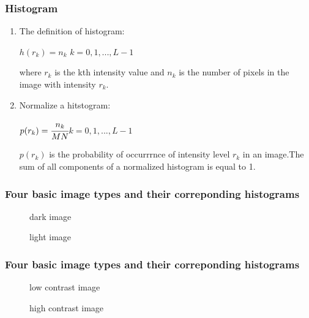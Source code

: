 \documentclass[notheorems,serif,table,compress]{beamer}  %
\begin{document}

\begin{frame}[fragile]
\frametitle{Histogram}
\begin{enumerate}
\item {\color{blue}The definition of histogram:}\\
\begin{center}
$h(r_k) = n_k$ \quad $k=0,1,...,L-1$
\end{center}
where $r_k$ is the kth intensity value and $n_k$ is the number of pixels in the image with intensity $r_k$.
\item {\color{blue}Normalize a hitstogram:}\\
\begin{center}
$p(r_k)=\cfrac{n_k}{MN}$\quad $k=0,1,...,L-1$
\end{center}
$p(r_k)$ is the probability of occurrrnce of intensity level $r_k$ in an image.The sum of all components of a normalized histogram is equal to 1.
\end{enumerate}

\end{frame}
\begin{frame}
\frametitle{Four basic image types and their correponding histograms}
\begin{figure}
\begin{center}
\end{center}
\caption{dark image}
\begin{center}
\end{center}
\caption{light image}
\end{figure}
\end{frame}
\begin{frame}
\frametitle{Four basic image types and their correponding histograms}
\begin{figure}
\begin{center}
\end{center}
\caption{low contrast image}
\begin{center}
\end{center}
\caption{high contrast image}
\end{figure}
\end{frame}
\end{document}

